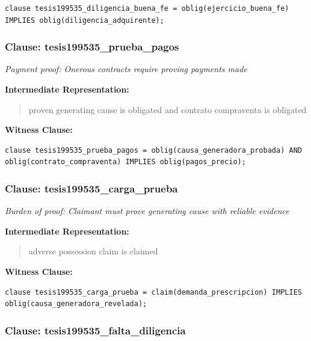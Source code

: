 \documentclass[11pt,a4paper]{article}
\begin{document}
\begin{lstlisting}[style=witnessstyle, language=Witness]
clause tesis199535_diligencia_buena_fe = oblig(ejercicio_buena_fe) IMPLIES oblig(diligencia_adquirente);
\end{lstlisting}

\subsubsection{Clause: tesis199535\_prueba\_pagos}

\textit{Payment proof: Onerous contracts require proving payments made}

\textbf{Intermediate Representation:}

\begin{quote}
proven generating cause is obligated and contrato compraventa is obligated
\end{quote}

\textbf{Witness Clause:}

\begin{lstlisting}[style=witnessstyle, language=Witness]
clause tesis199535_prueba_pagos = oblig(causa_generadora_probada) AND oblig(contrato_compraventa) IMPLIES oblig(pagos_precio);
\end{lstlisting}

\subsubsection{Clause: tesis199535\_carga\_prueba}

\textit{Burden of proof: Claimant must prove generating cause with reliable evidence}

\textbf{Intermediate Representation:}

\begin{quote}
adverse possession claim is claimed
\end{quote}

\textbf{Witness Clause:}

\begin{lstlisting}[style=witnessstyle, language=Witness]
clause tesis199535_carga_prueba = claim(demanda_prescripcion) IMPLIES oblig(causa_generadora_revelada);
\end{lstlisting}

\subsubsection{Clause: tesis199535\_falta\_diligencia}
\end{document}
